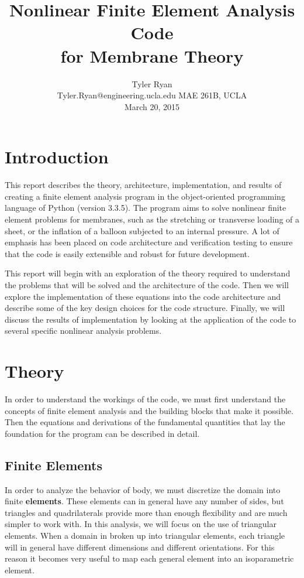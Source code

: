 \documentclass[]{spie}  %
\title{Nonlinear Finite Element Analysis Code\\ for Membrane Theory}
\author{Tyler Ryan \\
	Tyler.Ryan@engineering.ucla.edu
\skiplinehalf
MAE 261B, UCLA \\
March 20, 2015
}
\begin{document}
 
\maketitle 

\tableofcontents
\pagebreak

\section{Introduction}
\label{section: introduction}
This report describes the theory, architecture, implementation, and results of creating a finite element analysis program in the object-oriented programming language of Python (version 3.3.5). The program aims to solve nonlinear finite element problems for membranes, such as the stretching or transverse loading of a sheet, or the inflation of a balloon subjected to an internal pressure. A lot of emphasis has been placed on code architecture and verification testing to ensure that the code is easily extensible and robust for future development.

This report will begin with an exploration of the theory required to understand the problems that will be solved and the architecture of the code. Then we will explore the implementation of these equations into the code architecture and describe some of the key design choices for the code structure. Finally, we will discuss the results of implementation by looking at the application of the code to several specific nonlinear analysis problems. 

\section{Theory}
In order to understand the workings of the code, we must first understand the concepts of finite element analysis and the building blocks that make it possible. Then the equations and derivations of the fundamental quantities that lay the foundation for the program can be described in detail. 

\subsection{Finite Elements}
\label{sec: finite elements}
In order to analyze the behavior of body, we must discretize the domain into finite \textbf{elements}. These elements can in general have any number of sides, but triangles and quadrilaterals provide more than enough flexibility and are much simpler to work with. In this analysis, we will focus on the use of triangular elements. When a domain in broken up into triangular elements, each triangle will in general have different dimensions and different orientations. For this reason it becomes very useful to map each general element into an isoparametric element.
\end{document}
